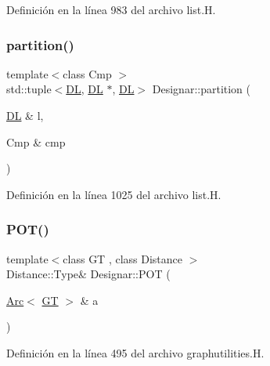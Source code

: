 Definición en la línea 983 del archivo list.\+H.

\mbox{\label{namespace_designar_af9be3d9a9287bf17a54090b14c06c611}} 
\subsubsection{\texorpdfstring{partition()}{partition()}\hspace{0.1cm}{\footnotesize\ttfamily [3/3]}}
{\footnotesize\ttfamily template$<$class Cmp $>$ \\
std\+::tuple$<$\hyperlink{class_designar_1_1_d_l}{DL}, \hyperlink{class_designar_1_1_d_l}{DL} $\ast$, \hyperlink{class_designar_1_1_d_l}{DL}$>$ Designar\+::partition (\begin{DoxyParamCaption}\item[{\hyperlink{class_designar_1_1_d_l}{DL} \&}]{l,  }\item[{Cmp \&}]{cmp }\end{DoxyParamCaption})\hspace{0.3cm}{\ttfamily [inline]}}



Definición en la línea 1025 del archivo list.\+H.

\mbox{\label{namespace_designar_afa0b0cf6848e8b604d27c630db119b29}} 
\subsubsection{\texorpdfstring{P\+O\+T()}{POT()}}
{\footnotesize\ttfamily template$<$class GT , class Distance $>$ \\
Distance\+::\+Type\& Designar\+::\+P\+OT (\begin{DoxyParamCaption}\item[{\hyperlink{namespace_designar_a3f55fb5513d62ff47cbc8f72b8e95d6f}{Arc}$<$ \hyperlink{demo-buildgraph_8_c_a3001c40d2c31ca87ed96cd7d1334a55e}{GT} $>$ \&}]{a }\end{DoxyParamCaption})\hspace{0.3cm}{\ttfamily [inline]}}



Definición en la línea 495 del archivo graphutilities.\+H.

\mbox{\label{namespace_designar_a94eeb5e794c32c27a0efc3e2218e9278}} 
